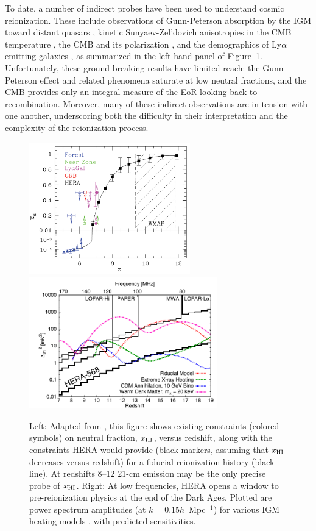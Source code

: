 \documentclass[preprint]{aastex}
\def\HI{{H{\small I }}}
\def\xHI{{x_{\rm\HI}}}
\begin{document}
To date, a number of indirect probes have been used to understand cosmic
reionization.  These include observations of Gunn-Peterson absorption by the
IGM toward distant quasars \citep{fan_et_al2006},
kinetic Sunyaev-Zel'dovich anisotropies in the CMB temperature \citep{zahn_et_al2012_trunc}, the CMB
\citep{planck_et_al2013} and its
polarization 
\citep{page_et_al2007}, and the
demographics of Ly$\alpha$ emitting galaxies
\citep{treu_et_al2013}, as summarized in 
the left-hand panel of Figure~\ref{fig:x_i_Xray}.  Unfortunately,
these ground-breaking results have limited reach: the
Gunn-Peterson effect and related phenomena saturate at low neutral fractions,
and the CMB provides only an integral measure of %
the EoR looking 
back to recombination.  Moreover, many of these indirect observations are in
tension with one another, underscoring both the difficulty in their interpretation
and the complexity of the reionization process.


\begin{figure}[t]\centering
\includegraphics[height=2.25in]{plots/constraints.pdf}
\includegraphics[height=2.25in]{plots/Xray.pdf} 
\caption{\small 
Left: Adapted from \citet{robertson_2013}, this figure shows existing
constraints (colored symbols) on neutral fraction, $\xHI$, versus redshift, along with 
the constraints HERA would provide (black markers, assuming
that $\xHI$ decreases versus redshift) for a fiducial
reionization history (black line).
At redshifts 8--12
21-cm emission may be the only precise probe of $\xHI$.
Right: At low frequencies, HERA opens a window to
pre-reionization physics at the end of the Dark Ages. Plotted are power spectrum amplitudes (at $k =
0.15h$~Mpc$^{-1}$) for various IGM heating models \citep{mesinger_et_al2013},
with predicted sensitivities.
}\label{fig:x_i_Xray} \end{figure}
\end{document}
